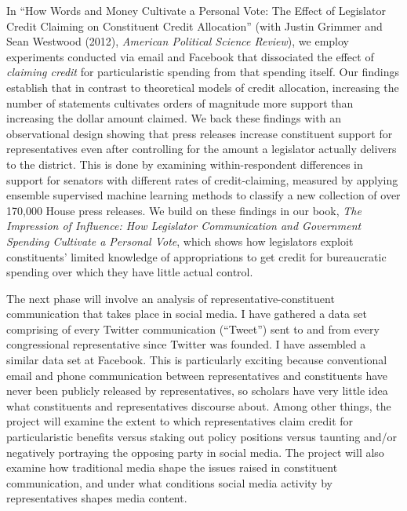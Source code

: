 \documentclass[12pt]{article}
\begin{document}
In ``How Words and Money Cultivate a Personal Vote: The Effect of Legislator Credit Claiming on Constituent Credit Allocation'' (with Justin Grimmer and Sean Westwood (2012), \emph{American Political Science Review}), we employ experiments conducted via email and Facebook that dissociated the effect of \emph{claiming credit} for particularistic spending from that spending itself.  Our findings establish that in contrast to theoretical models of credit allocation, increasing the number of statements cultivates orders of magnitude more support than increasing the dollar amount claimed.  We back these findings with an observational design showing that press releases increase constituent support for representatives even after controlling for the amount a legislator actually delivers to the district.  This is done by examining within-respondent differences in support for senators with different rates of credit-claiming, measured by applying ensemble supervised machine learning methods to classify a new collection of over 170,000 House press releases.  We build on these findings in our book, \emph{The Impression of Influence: How Legislator Communication and Government Spending Cultivate a Personal Vote}, which shows how legislators exploit constituents' limited knowledge of appropriations to get credit for bureaucratic spending over which they have little actual control.  


The next phase will involve an analysis of representative-constituent communication that takes place in social media.  I have gathered a data set comprising of every Twitter communication (``Tweet'') sent to and from every congressional representative since Twitter was founded. I have assembled a similar data set at Facebook.  This is particularly exciting because conventional email and phone communication between representatives and constituents have never been publicly released by representatives, so scholars have very little idea what constituents and representatives discourse about.  Among other things, the project will examine the extent to which representatives claim credit for particularistic benefits versus staking out policy positions versus taunting and/or negatively portraying the opposing party in social media.  The project will also examine how traditional media shape the issues raised in constituent communication, and under what conditions social media activity by representatives shapes media content.  
\end{document}
